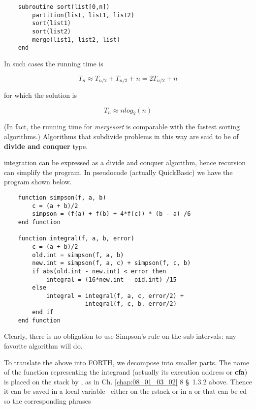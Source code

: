 \begin{verbatim}
    subroutine sort(list[0,n])
        partition(list, list1, list2)
        sort(list1)
        sort(list2)
        merge(list1, list2, list)
    end
\end{verbatim}

In such cases the running time is

\begin{equation}
T_{n} \approx T_{n/2} + T_{n/2} + n = 2T_{n/2} + n
\end{equation}

for which the solution is

\begin{equation}
T_{n} \approx n log_2 (n)
\end{equation}

(In fact, the running time for \textit{mergesort} is comparable with the fastest sorting algorithms.) Algorithms that subdivide problems in this way are said to be of \textbf{divide and conquer} type.

 integration can be expressed as a divide and conquer algorithm, hence recursion can simplify the program. In pseudocode (actually QuickBasic\textsuperscript{\textregistered}) we have the program shown
below.

\begin{verbatim}
    function simpson(f, a, b)
        c = (a + b)/2
        simpson = (f(a) + f(b) + 4*f(c)) * (b - a) /6
    end function

    function integral(f, a, b, error)
        c = (a + b)/2
        old.int = simpson(f, a, b)
        new.int = simpson(f, a, c) + simpson(f, c, b)
        if abs(old.int - new.int) < error then
            integral = (16*new.int - oid.int) /15
        else
            integral = integral(f, a, c, error/2) +
                       integral(f, c, b. error/2)
        end if
    end function
\end{verbatim}

Clearly, there is no obligation to use Simpson's rule on the sub-intervals: any favorite algorithm will do.

To translate the above into FORTH, we decompose into smaller parts. The name of the function representing the integrand (actually its execution address or \textbf{cfa}) is placed on the stack by , as in Ch. \ref{chap:08_01_03_02} 8 \S\ 1.3.2 above. Thence it can be saved in a local variable --either on the rstack or in a  or  that can be ed-- so the corresponding phrases

